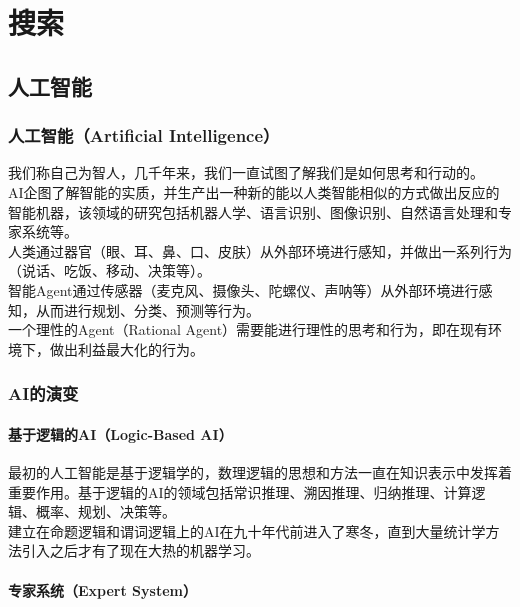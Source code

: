 \chapter{搜索}

\section{人工智能}

\subsection{人工智能（Artificial Intelligence）}

我们称自己为智人，几千年来，我们一直试图了解我们是如何思考和行动的。\\

AI企图了解智能的实质，并生产出一种新的能以人类智能相似的方式做出反应的智能机器，该领域的研究包括机器人学、语言识别、图像识别、自然语言处理和专家系统等。\\

人类通过器官（眼、耳、鼻、口、皮肤）从外部环境进行感知，并做出一系列行为（说话、吃饭、移动、决策等）。\\

智能Agent通过传感器（麦克风、摄像头、陀螺仪、声呐等）从外部环境进行感知，从而进行规划、分类、预测等行为。\\

一个理性的Agent（Rational Agent）需要能进行理性的思考和行为，即在现有环境下，做出利益最大化的行为。\\

\subsection{AI的演变}

\subsubsection{基于逻辑的AI（Logic-Based AI）}

最初的人工智能是基于逻辑学的，数理逻辑的思想和方法一直在知识表示中发挥着重要作用。基于逻辑的AI的领域包括常识推理、溯因推理、归纳推理、计算逻辑、概率、规划、决策等。\\

建立在命题逻辑和谓词逻辑上的AI在九十年代前进入了寒冬，直到大量统计学方法引入之后才有了现在大热的机器学习。\\

\subsubsection{专家系统（Expert System）}

